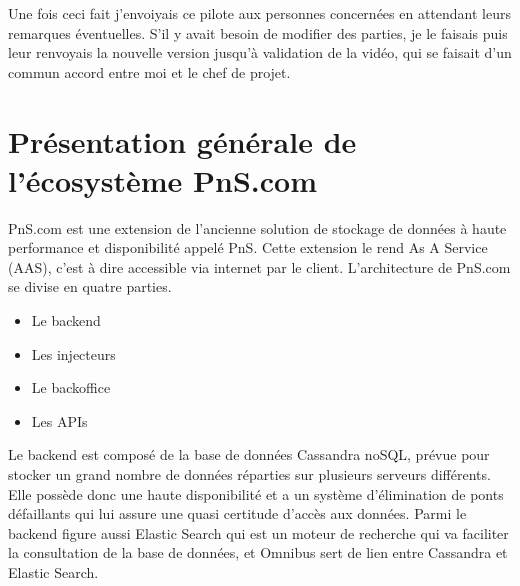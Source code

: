 Une fois ceci fait j'envoiyais ce pilote aux personnes concernées en attendant leurs remarques éventuelles. S'il y avait besoin de modifier des parties, je le faisais puis leur renvoyais la nouvelle version jusqu'à validation de la vidéo, qui se faisait d'un commun accord entre moi et le chef de projet.



\section{Présentation générale de l'écosystème PnS.com}


PnS.com est une extension de l'ancienne solution de stockage de données à haute performance et disponibilité appelé PnS. Cette extension le rend As A Service (AAS), c'est à dire accessible via internet par le client. L'architecture de PnS.com se divise en quatre parties.

\begin{itemize}
    \item Le backend
    \item Les injecteurs
    \item Le backoffice
    \item Les APIs
\end{itemize}




Le backend est composé de la base de données Cassandra noSQL, prévue pour stocker un grand nombre de données réparties sur plusieurs serveurs différents. Elle possède donc une haute disponibilité et a un système d'élimination de ponts défaillants qui lui assure une quasi certitude d'accès aux données. Parmi le backend figure aussi Elastic Search qui est un moteur de recherche qui va faciliter la consultation de la base de données, et Omnibus sert de lien entre Cassandra et Elastic Search.\\

